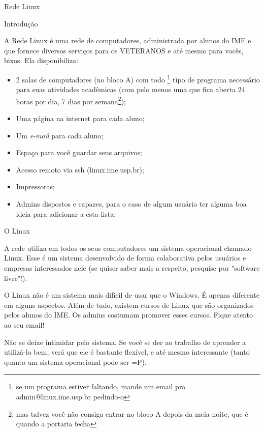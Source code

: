 \begin{secao}{Rede Linux}

\begin{subsecao}{Introdução}

A Rede Linux é uma rede de computadores, administrada por alunos do IME e
que fornece diversos serviços para os VETERANOS e até mesmo para vocês, bixos.
Ela disponibiliza:

\begin{itemize}
\item 2 salas de computadores (no bloco A) com todo \footnote{se um programa
estiver faltando, mande um email pra admin@linux.ime.usp.br pedindo-o} tipo de
programa necessário para suas atividades acadêmicas (com pelo menos uma que fica
aberta 24 horas por dia, 7 dias por semana\footnote{mas
talvez você não consiga entrar no bloco A depois da meia noite, que é quando a
portaria fecha});
\item Uma página na internet para cada aluno;
\item Um \textit{e-mail} para cada aluno;
\item Espaço para você guardar seus arquivos;
\item Acesso remoto via ssh (linux.ime.usp.br);
\item Impressoras;
\item Admins dispostos e capazes, para o caso de algum usuário ter alguma boa
ideia para adicionar a esta lista;
\end{itemize}
\end{subsecao}

\begin{subsecao}{O Linux}

A rede utiliza em todos os seus computadores um sistema operacional chamado
Linux. Esse é um sistema desenvolvido de forma colaborativa pelos usuários
e empresas interessados nele (se quiser saber mais a respeito, pesquise
por "software livre"!).

O Linux não é um sistema mais difícil de usar que o Windows. É apenas
diferente em alguns aspectos. Além de tudo, existem cursos de Linux que são
organizados pelos alunos do IME. Os admins costumam promover esses cursos.
Fique atento ao seu email!

Não se deixe intimidar pelo sistema. Se você se der ao trabalho de
aprender a utilizá-lo bem, verá que ele é bastante flexível, e até mesmo
interessante (tanto quanto um sistema operacional pode ser =P).

\end{subsecao}


\end{secao}
